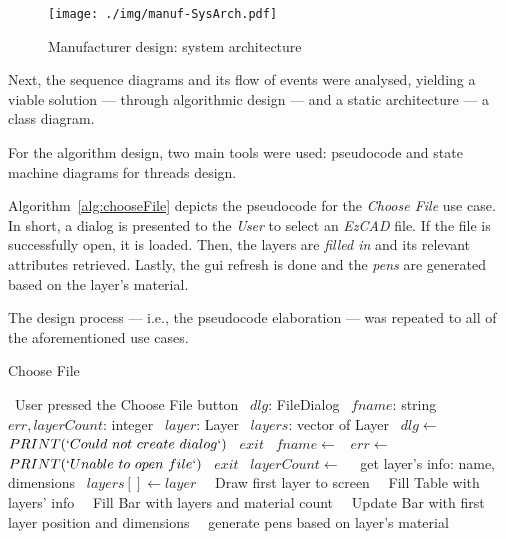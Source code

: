 \begin{figure}[!hbt]
  \centering
    \texttt{[image: ./img/manuf-SysArch.pdf]}
  \caption{Manufacturer design: system architecture}\label{fig:manuf-SysArch}
\end{figure}

Next, the sequence diagrams and its flow of events were analysed, yielding a
viable solution --- through algorithmic design --- and a static architecture ---
a class diagram.

For the algorithm design, two main tools were used: pseudocode and state machine
diagrams for threads design.

Algorithm~\ref{alg:chooseFile} depicts the pseudocode for the \emph{Choose File}
use case. In short, a dialog is presented to the \emph{User} to select an
\emph{EzCAD} file. If the file is successfully open, it is loaded. Then, the
layers are \emph{filled in} and its relevant attributes retrieved. Lastly, the
\gls{gui} refresh is done and the \emph{pens} are generated based on the layer's
material.

The design process --- i.e., the pseudocode elaboration --- was repeated to all
of the aforementioned use cases. 
% 
\begin{algorithm}[!hbt]
  \caption{Choose File}\label{alg:chooseFile}
  \begin{algorithmic}[1] %
    \Require~User pressed the Choose File button
    \Variables%
    \State~$dlg$: FileDialog
    \State~$fname$: string
    \State~$err, layerCount$: integer
    \State~$layer$: Layer%
    \State~$layers$: vector of Layer%
    \EndVariables%
    \State~$dlg \gets $ 
    \State~$PRINT(`Could~not~create~dialog`)$%
    \State~$exit$%
    \EndIf%
    \State~$fname \gets $%
    \State~$err \gets $%
    \State~$PRINT(`Unable~to~open~file`)$%
    \State~$exit$%
    \EndIf%
    \State~$layerCount \gets $%
    \State~\Comment~{get layer's info:
      name, dimensions}%
    \State~$layers[] \gets layer$%
    \EndFor%
    \State~\Comment~{Draw first layer to
      screen}
    \State~\Comment~{Fill Table with layers' info}
    \State~\Comment~{Fill Bar with layers and
      material count}
    \State~\Comment~{Update Bar with first layer
      position and dimensions}
    \State~\Comment~{generate pens based on layer's
      material}
    \EndProcedure%
  \end{algorithmic}
\end{algorithm}

